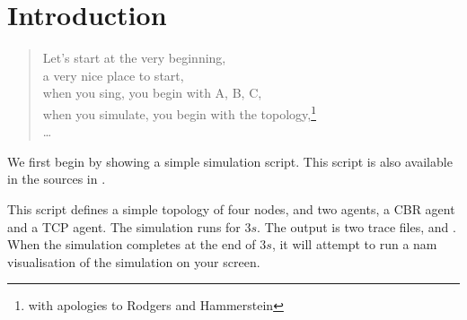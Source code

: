 
\chapter{Introduction}

\begin{quote}
Let's start at the very beginning, \\
a very nice place to start, \\
when you sing, you begin with A, B, C, \\
when you simulate, you begin with the topology,\footnote{%
with apologies to Rodgers and Hammerstein}\\
\ldots
\end{quote}

We first begin by showing a simple simulation script.
This script is also available in the sources in
.

This script defines a simple topology of four nodes,
and two agents, a CBR agent and a TCP agent.
The simulation runs for $3s$.  The output is two trace files,
 and .
When the simulation completes at the end of $3s$,
it will attempt to run a nam visualisation of the simulation on your
screen.

